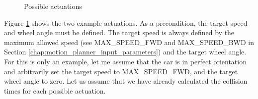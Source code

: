 \begin{figure}[!ht]
    \centering
    \caption{Possible actuations}
    \label{possible_actuations}
\end{figure}

Figure \ref{possible_actuations} shows the two example actuations. As a precondition, the target speed and wheel angle must be defined. The target speed is always defined by the maximum allowed speed (see MAX\_SPEED\_FWD and MAX\_SPEED\_BWD in Section \ref{chap:motion_planner_input_parameters}) and the target wheel angle. For this is only an example, let me assume that the car is in perfect orientation and arbitrarily set the target speed to MAX\_SPEED\_FWD, and the target wheel angle to zero. Let us assume that we have already calculated the collision times for each possible actuation.

